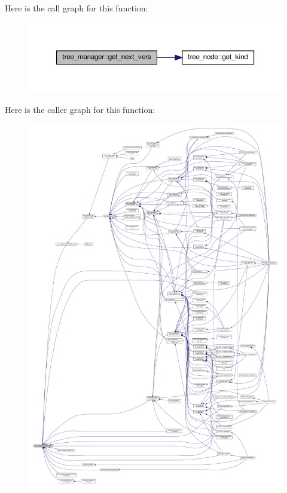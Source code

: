Here is the call graph for this function\+:
\nopagebreak
\begin{figure}[H]
\begin{center}
\leavevmode
\includegraphics[width=350pt]{d2/ddd/classtree__manager_a7cf60d6250535345f863880c615e7d95_cgraph}
\end{center}
\end{figure}
Here is the caller graph for this function\+:
\nopagebreak
\begin{figure}[H]
\begin{center}
\leavevmode
\includegraphics[width=350pt]{d2/ddd/classtree__manager_a7cf60d6250535345f863880c615e7d95_icgraph}
\end{center}
\end{figure}
\mbox{\label{classtree__manager_aa80a54972baf7c38ccd78afd3ea9dc73}} 
